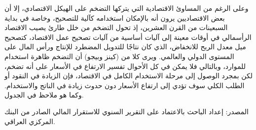 \documentclass[10pt,a4paper]{report}
\begin{document}
\begin{doublespacing}
وعلى الرغم من المساوئ الاقتصادية التي يتركها التضخم على الهيكل الاقتصادي، إلا أن بعض الاقتصاديين يرون أنه بالإمكان استخدامه كآلية للتصحيح، وخاصة في بداية السبعينات من القرن العشرين، إذ تحول التضخم من خلل طارئ يصيب الاقتصاد الرأسمالي في أوقات معينة إلى آليات أساسية من آليات تصحيح عمل الاقتصاد، كتصحيح ميل معدل الربح للانخفاض، الذي كان نتاجًا للتدويل المضطرد للإنتاج ورأس المال على المستوى الدولي والعالمي. ويرى كلا من (كينز وبيجو) أن التضخم ظاهرة استخدام للموارد، وبالتالي فلا يمكن في كل الأحوال تفسير الارتفاع في الأسعار على أنه تضخم، لكن بمجرد الوصول إلى مرحلة الاستخدام الكامل في الاقتصاد، فإن الزيادة في النقود أو الطلب الكلي سوف تؤدي إلى ارتفاع الأسعار دون حدوث زيادة في الناتج والاستخدام. وكما هو ملاحظ في الجدول.
\begin{table}[H]
	\captionsetup{font=Large}  %
	\fontsize{14}{12}\selectfont
	\centering
	\caption{معدل التضخم في العراق للمدة 2010-2021}
	\label{tab:9.3}
	\end{table}
المصدر: إعداد الباحث بالاعتماد على التقرير السنوي للاستقرار المالي الصادر من البنك المركزي العراقي.


\end{doublespacing}
\end{document}
